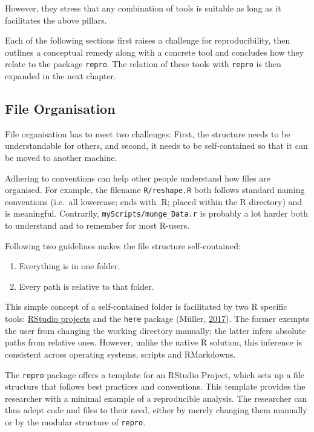 \documentclass[12pt,a4paper,twoside]{article}
\providecommand{\tightlist}{%
  \setlength{\itemsep}{0pt}\setlength{\parskip}{0pt}}
\begin{document}
However, they stress that any combination of tools is suitable as long as it facilitates the above pillars.

Each of the following sections first raises a challenge for reproducibility, then outlines a conceptual remedy along with a concrete tool and concludes how they relate to the package \texttt{repro}. The relation of these tools with \texttt{repro} is then expanded in the next chapter.

\hypertarget{file-organisation}{%
\subsection{File Organisation}\label{file-organisation}}

File organisation has to meet two challenges: First, the structure needs to be understandable for others, and second, it needs to be self-contained so that it can be moved to another machine.

Adhering to conventions can help other people understand how files are organised.
For example, the filename \texttt{R/reshape.R} both follows standard naming conventions (i.e.~all lowercase; ends with .R; placed within the R directory) and is meaningful. Contrarily, \texttt{myScripts/munge\_Data.r} is probably a lot harder both to understand and to remember for most R-users.

Following two guidelines makes the file structure self-contained:

\begin{enumerate}
\def\labelenumi{\arabic{enumi}.}
\tightlist
\item
  Everything is in one folder.
\item
  Every path is relative to that folder.
\end{enumerate}

This simple concept of a self-contained folder is facilitated by two R specific tools: \href{https://r4ds.had.co.nz/workflow-projects.html}{RStudio projects} and the \texttt{here} package (Müller, \protect\hyperlink{ref-R-here}{2017}).
The former exempts the user from changing the working directory manually; the latter infers absolute paths from relative ones.
However, unlike the native R solution, this inference is consistent across operating systems, scripts and RMarkdowns.

The \texttt{repro} package offers a template for an RStudio Project, which sets up a file structure that follows best practices and conventions.
This template provides the researcher with a minimal example of a reproducible analysis.
The researcher can thus adept code and files to their need, either by merely changing them manually or by the modular structure of \texttt{repro}.
\end{document}

